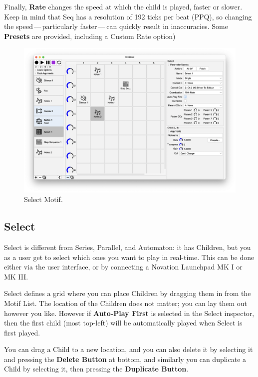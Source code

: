 \documentclass[twoside,10pt]{article}
\begin{document}
Finally, {\bf Rate} changes the speed at which the child is played, faster or slower.  Keep in mind that Seq has a resolution of 192 ticks per beat (PPQ), so changing the speed\,---\,particularly faster\,---\,can quickly result in inaccuracies.    Some {\bf Presets} are provided, including a Custom Rate option)

\clearpage

\begin{figure}[t]
\centering
\includegraphics[width=6.5in]{Select}
\vspace{-2em}
\caption{Select Motif.}
\label{select}
\end{figure}

\subsection{Select}

Select is different from Series, Parallel, and Automaton: it has Children, but you as a user get to select which ones you want to play in real-time.  This can be done either via the user interface, or by connecting a Novation Launchpad MK I or MK III.

Select defines a grid where you can place Children by dragging them in from the Motif List.  The location of the Children does not matter; you can lay them out however you like.  However if {\bf Auto-Play First} is selected in the Select inspector, then the first child (most top-left) will be automatically played when Select is first played.

You can drag a Child to a new location, and you can also  delete it by selecting it and pressing the {\bf Delete Button} at bottom, and similarly you can duplicate a Child by selecting it, then pressing the {\bf Duplicate Button}. 
\end{document}

